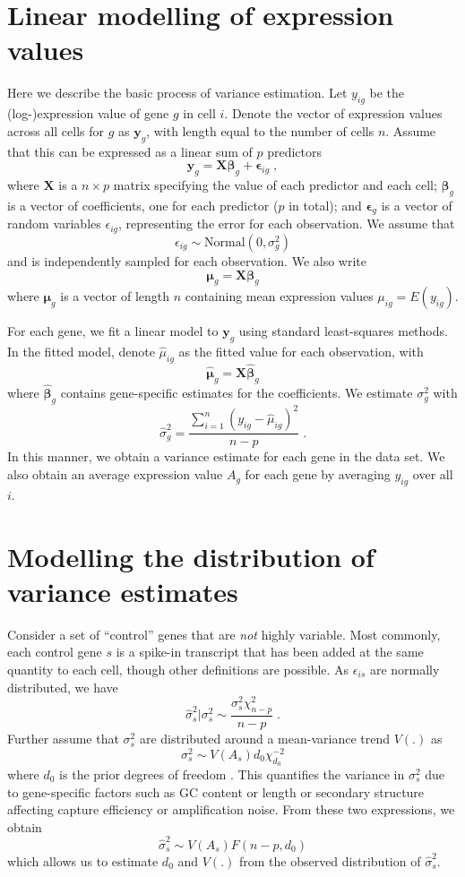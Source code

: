 \documentclass{article}
\begin{document}
\section{Linear modelling of expression values}
Here we describe the basic process of variance estimation.
Let $y_{ig}$ be the (log-)expression value of gene $g$ in cell $i$.
Denote the vector of expression values across all cells for $g$ as $\bm{y}_g$, with length equal to the number of cells $n$.
Assume that this can be expressed as a linear sum of $p$ predictors
\[
\bm{y}_g = \bm{X}\bm{\beta}_g + \bm{\epsilon}_{ig} \;,
\]
where $\bm{X}$ is a $n\times p$ matrix specifying the value of each predictor and each cell;
$\bm{\beta}_g$ is a vector of coefficients, one for each predictor ($p$ in total);
and $\bm{\epsilon}_{g}$ is a vector of random variables $\epsilon_{ig}$, representing the error for each observation.
We assume that 
\[
    \epsilon_{ig} \sim \mbox{Normal}(0, \sigma^2_g)
\]
and is independently sampled for each observation.
We also write
\[
\bm{\mu}_g = \bm{X}\bm{\beta}_g
\]
where $\bm{\mu}_g$ is a vector of length $n$ containing mean expression values $\mu_{ig} = E(y_{ig})$.

For each gene, we fit a linear model to $\bm{y}_g$ using standard least-squares methods.
In the fitted model, denote $\hat\mu_{ig}$ as the fitted value for each observation, with
\[
\bm{\hat\mu}_{g} = \bm{X} \bm{\hat\beta}_g
\]
where $\bm{\hat\beta}_g$ contains gene-specific estimates for the coefficients.
We estimate $\sigma^2_g$ with
\[
\hat\sigma^2_g = \frac{\sum_{i=1}^{n} (y_{ig} - \hat\mu_{ig})^2}{n-p} \;.
\] 
In this manner, we obtain a variance estimate for each gene in the data set.
We also obtain an average expression value $A_g$ for each gene by averaging $y_{ig}$ over all $i$.

\section{Modelling the distribution of variance estimates}
Consider a set of ``control'' genes that are \textit{not} highly variable. 
Most commonly, each control gene $s$ is a spike-in transcript that has been added at the same quantity to each cell, though other definitions are possible.
As $\epsilon_{is}$ are normally distributed, we have
\[
    \hat\sigma^2_s|\sigma^2_s \sim \frac{\sigma^2_s\chi^2_{n-p}}{n-p} \;.
\]
Further assume that $\sigma^2_s$ are distributed around a mean-variance trend $V(.)$ as
\[
\sigma^2_s \sim V(A_s) d_0 \chi^{-2}_{d_0}
\]
where $d_0$ is the prior degrees of freedom \citep{smyth2004linear}.
This quantifies the variance in $\sigma^2_s$ due to gene-specific factors such as GC content or length or secondary structure affecting capture efficiency or amplification noise.
From these two expressions, we obtain
\begin{equation}
    \hat\sigma^2_s \sim V(A_s)F(n-p, d_0) \label{eqn:estdist}
\end{equation}
which allows us to estimate $d_0$ and $V(.)$ from the observed distribution of $\hat\sigma^2_s$.
\end{document}
